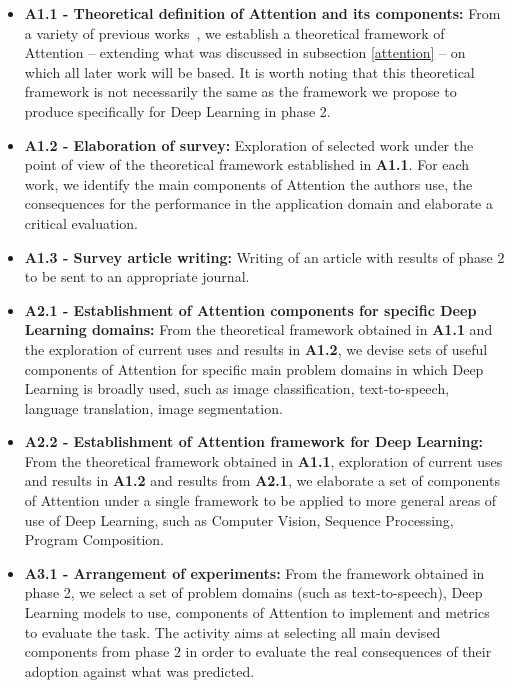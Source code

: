 \documentclass[12pt]{article}
\begin{document}
\begin{itemize}
    \item \textbf{A1.1 - Theoretical definition of Attention and its components:}
        From a variety of previous works~\cite{ref:helgason}\cite{ref:esther-thesis},
        we establish a theoretical framework of Attention
        -- extending what was discussed in subsection \ref{attention} --
        on which all later work will be based.
        It is worth noting that this theoretical framework is not necessarily the same as the framework
        we propose to produce specifically for Deep Learning in phase 2.

    \item \textbf{A1.2 - Elaboration of survey:}
        Exploration of selected work under the point of view of the theoretical framework established
        in \textbf{A1.1}.
        For each work, we identify the main components of Attention the authors use, the consequences for the
        performance in the application domain and elaborate a critical evaluation.

    \item \textbf{A1.3 - Survey article writing:}
        Writing of an article with results of phase $2$ to be sent to an appropriate journal.

    \item \textbf{A2.1 - Establishment of Attention components for specific Deep Learning domains:}
        From the theoretical framework obtained in \textbf{A1.1}
        and the exploration of current uses and results in \textbf{A1.2},
        we devise sets of useful components of Attention for specific main problem domains
        in which Deep Learning is broadly used,
        such as image classification, text-to-speech, language translation, image segmentation.

    \item \textbf{A2.2 - Establishment of Attention framework for Deep Learning:}
        From the theoretical framework obtained in \textbf{A1.1},
        exploration of current uses and results in \textbf{A1.2} and
        results from \textbf{A2.1},
        we elaborate a set of components of Attention under a single framework to be applied to more
        general areas of use of Deep Learning,
        such as Computer Vision, Sequence Processing, Program Composition.

    \item \textbf{A3.1 - Arrangement of experiments:}
        From the framework obtained in phase 2, we select a set of problem domains (such as text-to-speech),
        Deep Learning models to use, components of Attention to implement and metrics to evaluate the task.
        The activity aims at selecting all main devised components from phase $2$ in order
        to evaluate the real consequences of their adoption against what was predicted.


\end{itemize}
\end{document}
